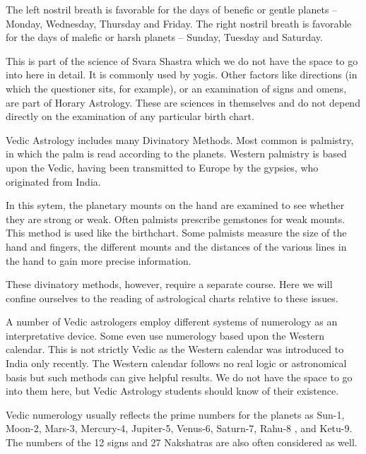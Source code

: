  

The left nostril breath is favorable for the days of benefic or gentle planets – Monday, Wednesday, Thursday and Friday.
The right nostril breath is favorable for the days of malefic or harsh planets – Sunday, Tuesday and Saturday.
 

This is part of the science of Svara Shastra which we do not have the space to go into here in detail. It is commonly used by yogis. Other factors like directions (in which the questioner sits, for example), or an examination of signs and omens, are part of Horary Astrology. These are sciences in themselves and do not depend directly on the examination of any particular birth chart.

 


Vedic Astrology includes many Divinatory Methods. Most common is palmistry, in which the palm is read according to the planets. Western palmistry is based upon the Vedic, having been transmitted to Europe by the gypsies, who originated from India.

 

In this sytem, the planetary mounts on the hand are examined to see whether they are strong or weak. Often palmists prescribe gemstones for weak mounts. This method is used like the birthchart. Some palmists measure the size of the hand and fingers, the different mounts and the distances of the various lines in the hand to gain more precise information.

 

These divinatory methods, however, require a separate course. Here we will confine ourselves to the reading of astrological charts relative to these issues.

 


A number of Vedic astrologers employ different systems of numerology as an interpretative device. Some even use numerology based upon the Western calendar. This is not strictly Vedic as the Western calendar was introduced to India only recently. The Western calendar follows no real logic or astronomical basis but such methods can give helpful results. We do not have the space to go into them here, but Vedic Astrology students should know of their existence.

 

Vedic numerology usually reflects the prime numbers for the planets as Sun-1, Moon-2, Mars-3, Mercury-4, Jupiter-5, Venus-6, Saturn-7, Rahu-8 , and Ketu-9. The numbers of the 12 signs and 27 Nakshatras are also often considered as well.